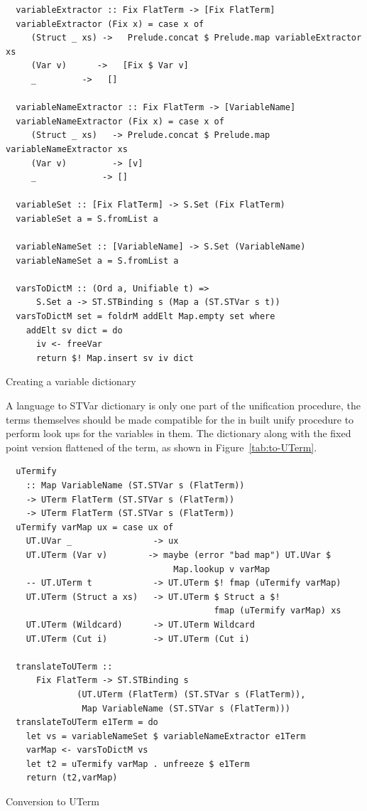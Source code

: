 \documentclass[thesis-solanki.tex]{subfiles}
\begin{document}
\begin{code-list}
  \begin{verbatim}
  variableExtractor :: Fix FlatTerm -> [Fix FlatTerm]
  variableExtractor (Fix x) = case x of
     (Struct _ xs) ->   Prelude.concat $ Prelude.map variableExtractor xs
     (Var v)      ->   [Fix $ Var v]
     _         ->   []

  variableNameExtractor :: Fix FlatTerm -> [VariableName]
  variableNameExtractor (Fix x) = case x of
     (Struct _ xs)   -> Prelude.concat $ Prelude.map variableNameExtractor xs
     (Var v)         -> [v]
     _             -> []

  variableSet :: [Fix FlatTerm] -> S.Set (Fix FlatTerm)
  variableSet a = S.fromList a

  variableNameSet :: [VariableName] -> S.Set (VariableName)
  variableNameSet a = S.fromList a

  varsToDictM :: (Ord a, Unifiable t) =>
      S.Set a -> ST.STBinding s (Map a (ST.STVar s t))
  varsToDictM set = foldrM addElt Map.empty set where
    addElt sv dict = do
      iv <- freeVar
      return $! Map.insert sv iv dict
  \end{verbatim}
  \vspace*{-1.0\baselineskip}
  \caption{Creating a variable dictionary}
  \label{tab:varsToDictM}
\end{code-list}
A language to STVar dictionary is only one part of the unification procedure, the terms themselves should be made
compatible for the in built unify procedure to perform look ups for the variables in them.
The dictionary along with the fixed point version flattened of the term, as shown in Figure~\ref{tab:to-UTerm}.
%
\begin{code-list}
  \begin{verbatim}
  uTermify
    :: Map VariableName (ST.STVar s (FlatTerm))
    -> UTerm FlatTerm (ST.STVar s (FlatTerm))
    -> UTerm FlatTerm (ST.STVar s (FlatTerm))
  uTermify varMap ux = case ux of
    UT.UVar _                -> ux
    UT.UTerm (Var v)        -> maybe (error "bad map") UT.UVar $
                                 Map.lookup v varMap
    -- UT.UTerm t            -> UT.UTerm $! fmap (uTermify varMap)
    UT.UTerm (Struct a xs)   -> UT.UTerm $ Struct a $!
                                         fmap (uTermify varMap) xs
    UT.UTerm (Wildcard)      -> UT.UTerm Wildcard
    UT.UTerm (Cut i)         -> UT.UTerm (Cut i)

  translateToUTerm ::
      Fix FlatTerm -> ST.STBinding s
              (UT.UTerm (FlatTerm) (ST.STVar s (FlatTerm)),
               Map VariableName (ST.STVar s (FlatTerm)))
  translateToUTerm e1Term = do
    let vs = variableNameSet $ variableNameExtractor e1Term
    varMap <- varsToDictM vs
    let t2 = uTermify varMap . unfreeze $ e1Term
    return (t2,varMap)
  \end{verbatim}
  \caption{Conversion to UTerm}
  \label{tab:to-UTerm}
\end{code-list}
\end{document}
